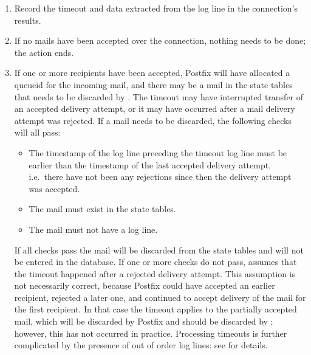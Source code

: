 \begin{enumerate}

    \item Record the timeout and data extracted from the log line in the
        connection's results.

    \item If no mails have been accepted over the connection, nothing needs
        to be done; the  action ends.

    \item If one or more recipients have been accepted, Postfix will have
        allocated a queueid for the incoming mail, and there may be a mail
        in the state tables that needs to be discarded by \parsername{}.
        The timeout may have interrupted transfer of an accepted delivery
        attempt, or it may have occurred after a mail delivery attempt was
        rejected.  If a mail needs to be discarded, the following checks
        will all pass:

        \begin{itemize}

            \item The timestamp of the log line preceding the timeout log
                line must be earlier than the timestamp of the last
                accepted delivery attempt, i.e.\ there have not been any
                rejections since then the delivery attempt was accepted.

            \item The mail must exist in the state tables.

            \item The mail must not have a  log line.

        \end{itemize}

        If all checks pass the mail will be discarded from the state tables
        and will not be entered in the database.  If one or more checks do
        not pass, \parsername{} assumes that the timeout happened after a
        rejected delivery attempt.  This assumption is not necessarily
        correct, because Postfix could have accepted an earlier recipient,
        rejected a later one, and continued to accept delivery of the mail
        for the first recipient.  In that case the timeout applies to the
        partially accepted mail, which will be discarded by Postfix and
        should be discarded by \parsername{}; however, this has not
        occurred in practice.  Processing timeouts is further complicated
        by the presence of out of order  log lines: see
         for details.

\end{enumerate}


